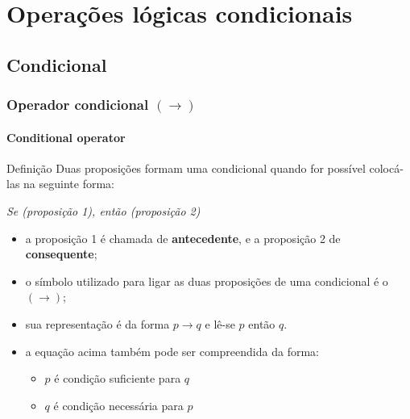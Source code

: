 
\section{Operações lógicas condicionais}
%
\subsection{Condicional}
%
\begin{frame}[t]
    \frametitle{Operador condicional $(\rightarrow)$ }
    \framesubtitle{Conditional operator}
    \vspace{-2mm}
    \begin{block}{Definição}
        Duas proposições formam uma condicional quando for possível colocá-las na seguinte forma: \\[2pt]
        \begin{center}
            \textit{Se (proposição 1), então (proposição 2)}
        \end{center}
        \begin{itemize}
            \item a proposição 1 é chamada de \textbf{antecedente}, e a proposição 2 de \textbf{consequente};
            \item o símbolo utilizado para ligar as duas proposições de uma condicional é o $(\rightarrow)$;
            \item sua representação é da forma $p \rightarrow q$ e lê-se $p$ então $q$.
            \item a equação acima também pode ser compreendida da forma:
            \begin{itemize}
                \item[\ding{114}] $p$ é condição suficiente para $q$
                \item[\ding{114}] $q$ é condição necessária para $p$
            \end{itemize}
        \end{itemize}
    \end{block}
\end{frame}
%
